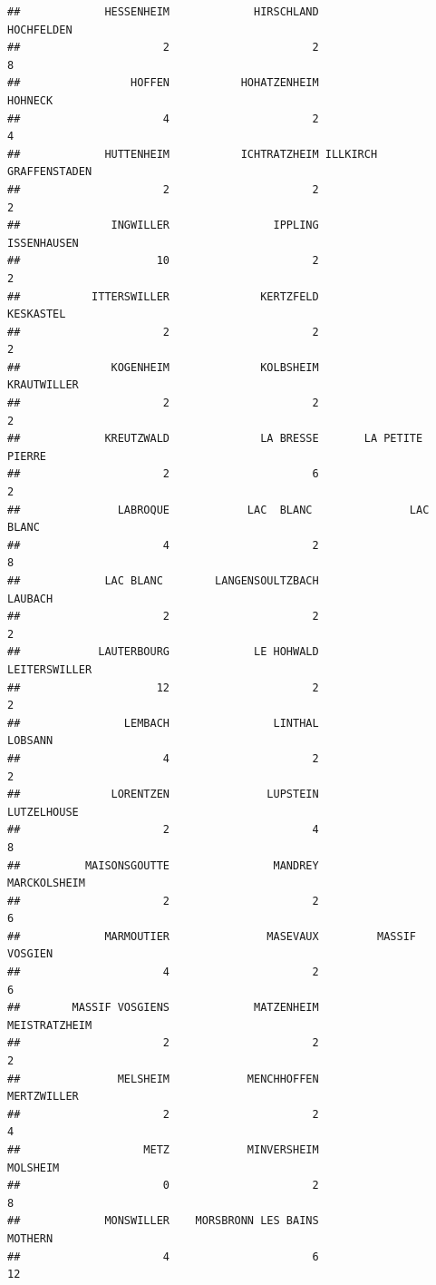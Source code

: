 \documentclass{article}\usepackage[]{graphicx}\usepackage[]{color}
\makeatletter
\newenvironment{kframe}{%
 \def\at@end@of@kframe{}%
 \ifinner\ifhmode%
  \def\at@end@of@kframe{\end{minipage}}%
  \begin{minipage}{\columnwidth}%
 \fi\fi%
 \def\FrameCommand##1{\hskip\@totalleftmargin \hskip-\fboxsep
 \colorbox{shadecolor}{##1}\hskip-\fboxsep
     \hskip-\linewidth \hskip-\@totalleftmargin \hskip\columnwidth}%
 \MakeFramed {\advance\hsize-\width
   \@totalleftmargin\z@ \linewidth\hsize
   \@setminipage}}%
 {\par\unskip\endMakeFramed%
 \at@end@of@kframe}
\newenvironment{knitrout}{}{} %
\makeatother
\begin{document}
\begin{knitrout}
\begin{kframe}
\begin{verbatim}
##             HESSENHEIM             HIRSCHLAND             HOCHFELDEN 
##                      2                      2                      8 
##                 HOFFEN           HOHATZENHEIM                HOHNECK 
##                      4                      2                      4 
##             HUTTENHEIM           ICHTRATZHEIM ILLKIRCH GRAFFENSTADEN 
##                      2                      2                      2 
##              INGWILLER                IPPLING            ISSENHAUSEN 
##                     10                      2                      2 
##           ITTERSWILLER              KERTZFELD              KESKASTEL 
##                      2                      2                      2 
##              KOGENHEIM              KOLBSHEIM            KRAUTWILLER 
##                      2                      2                      2 
##             KREUTZWALD              LA BRESSE       LA PETITE PIERRE 
##                      2                      6                      2 
##               LABROQUE            LAC  BLANC               LAC BLANC 
##                      4                      2                      8 
##             LAC BLANC        LANGENSOULTZBACH                LAUBACH 
##                      2                      2                      2 
##            LAUTERBOURG             LE HOHWALD          LEITERSWILLER 
##                     12                      2                      2 
##                LEMBACH                LINTHAL                LOBSANN 
##                      4                      2                      2 
##              LORENTZEN               LUPSTEIN            LUTZELHOUSE 
##                      2                      4                      8 
##          MAISONSGOUTTE                MANDREY           MARCKOLSHEIM 
##                      2                      2                      6 
##             MARMOUTIER               MASEVAUX         MASSIF VOSGIEN 
##                      4                      2                      6 
##        MASSIF VOSGIENS             MATZENHEIM          MEISTRATZHEIM 
##                      2                      2                      2 
##               MELSHEIM            MENCHHOFFEN            MERTZWILLER 
##                      2                      2                      4 
##                   METZ            MINVERSHEIM               MOLSHEIM 
##                      0                      2                      8 
##             MONSWILLER    MORSBRONN LES BAINS                MOTHERN 
##                      4                      6                     12 

\end{verbatim}
\end{kframe}
\end{knitrout}
\end{document}
